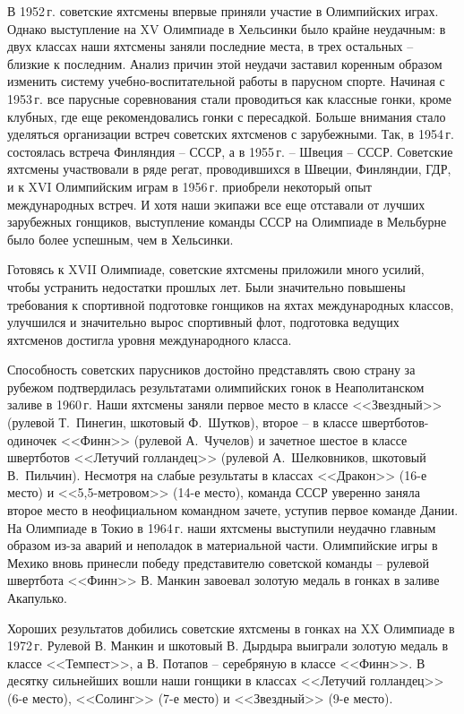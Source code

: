 \documentclass[a4paper, 12pt, twoside, final]{scrbook}
\begin{document}
В 1952\,г. советские яхтсмены впервые приняли участие в Олимпийских
играх. Однако выступление на XV Олимпиаде в Хельсинки было крайне
неудачным: в двух классах наши яхтсмены заняли последние места, в
трех остальных \--- близкие к последним. Анализ причин этой неудачи заставил
коренным образом изменить систему учебно-воспитательной работы в
парусном спорте. Начиная с 1953\,г. все парусные соревнования стали
проводиться как классные гонки, кроме клубных, где еще рекомендовались
гонки с пересадкой. Больше внимания стало уделяться организации встреч
советских яхтсменов с зарубежными. Так, в 1954\,г. состоялась встреча
Финляндия \--- СССР, а в 1955\,г. \--- Швеция \--- СССР. Советские яхтсмены
участвовали в ряде регат, проводившихся в Швеции, Финляндии, ГДР,
и к XVI Олимпийским играм в 1956\,г. приобрели некоторый опыт международных
встреч. И хотя наши экипажи все еще отставали от лучших зарубежных
гонщиков, выступление команды СССР на Олимпиаде в Мельбурне было более
успешным, чем в Хельсинки. 

Готовясь к XVII Олимпиаде, советские яхтсмены приложили много усилий,
чтобы устранить недостатки прошлых лет. Были значительно повышены
требования к спортивной подготовке гонщиков на яхтах международных
классов, улучшился и значительно вырос спортивный флот, подготовка
ведущих яхтсменов достигла уровня международного класса.

Способность советских парусников достойно представлять свою страну
за рубежом подтвердилась результатами олимпийских гонок в Неаполитанском
заливе в 1960\,г. Наши яхтсмены заняли первое место в классе <<Звездный>>
(рулевой Т.~Пинегин, шкотовый Ф.~Шутков), второе \--- в классе швертботов-одиночек
<<Финн>> (рулевой А.~Чучелов) и зачетное шестое в классе швертботов
<<Летучий голландец>> (рулевой А.~Шелковников, шкотовый В.~Пильчин).
Несмотря на слабые результаты в классах <<Дракон>> (16-е место) и <<5,5-метровом>>
(14-е место), команда СССР уверенно заняла второе место в неофициальном
командном зачете, уступив первое команде Дании. На Олимпиаде в Токио
в 1964\,г. наши яхтсмены выступили неудачно главным образом из-за аварий
и неполадок в материальной части. Олимпийские игры в Мехико вновь
принесли победу представителю советской команды \--- рулевой швертбота
<<Финн>> В. Манкин завоевал золотую медаль в гонках в заливе Акапулько.

Хороших результатов добились советские яхтсмены в гонках на XX Олимпиаде
в 1972\,г. Рулевой В. Манкин и шкотовый В. Дырдыра выиграли золотую
медаль в классе <<Темпест>>, а В. Потапов \--- серебряную в классе <<Финн>>.
В десятку сильнейших вошли наши гонщики в классах <<Летучий голландец>>
(6-е место), <<Солинг>> (7-е место) и <<Звездный>> (9-е место).
\end{document}
